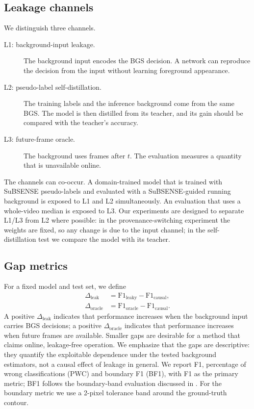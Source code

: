 \documentclass[sn-mathphys-num,iicol]{sn-jnl}
\begin{document}
\subsection{Leakage channels}\label{sec:leakage}

We distinguish three channels.
\begin{description}
\item[L1: background-input leakage.] The background input encodes the BGS
decision. A network can reproduce the decision from the input without learning
foreground appearance.
\item[L2: pseudo-label self-distillation.] The training labels and the inference
background come from the same BGS. The model is then distilled from its teacher,
and its gain should be compared with the teacher's accuracy.
\item[L3: future-frame oracle.] The background uses frames after $t$. The
evaluation measures a quantity that is unavailable online.
\end{description}

The channels can co-occur. A domain-trained model that is trained with SuBSENSE
pseudo-labels and evaluated with a SuBSENSE-guided running background is exposed
to L1 and L2 simultaneously. An evaluation that uses a whole-video median is
exposed to L3. Our experiments are designed to separate L1/L3 from L2 where
possible: in the provenance-switching experiment the weights are fixed, so any
change is due to the input channel; in the self-distillation test we compare the
model with its teacher.

\subsection{Gap metrics}\label{sec:metrics}

For a fixed model and test set, we define
\begin{equation}
\begin{aligned}
\Delta_{\mathrm{leak}} &= \mathrm{F1}_{\mathrm{leaky}} -
\mathrm{F1}_{\mathrm{causal}},\\
\Delta_{\mathrm{oracle}} &= \mathrm{F1}_{\mathrm{oracle}} -
\mathrm{F1}_{\mathrm{causal}}.
\end{aligned}
\label{eq:gaps}
\end{equation}
A positive $\Delta_{\mathrm{leak}}$ indicates that performance increases when the
background input carries BGS decisions; a positive $\Delta_{\mathrm{oracle}}$
indicates that performance increases when future frames are available. Smaller
gaps are desirable for a method that claims online, leakage-free operation. We
emphasize that the gaps are descriptive: they quantify the exploitable dependence
under the tested background estimators, not a causal effect of leakage in
general. We report F1, percentage of wrong classifications (PWC) and boundary F1
(BF1), with F1 as the primary metric; BF1 follows the boundary-band evaluation
discussed in \cite{evalmeasure2013}. For the boundary metric we use a 2-pixel
tolerance band around the ground-truth contour.
\end{document}
